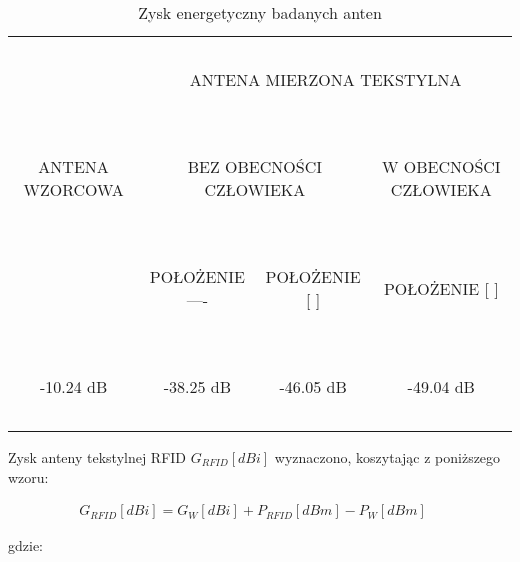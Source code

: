 \begin{table}[h!]
\begin{center}
    \begin{tabular}{|c|c|c|c|}
    \hline
    ~               & \multicolumn{3}{c|}{~}     \\
    ~               & \multicolumn{3}{c|}{ANTENA MIERZONA TEKSTYLNA } \\
    ~               & \multicolumn{3}{c|}{~}     \\ \hline
    ~               & \multicolumn{2}{c|}{~}     & ~                                  \\
    ANTENA WZORCOWA & \multicolumn{2}{c|}{BEZ OBECNOŚCI CZŁOWIEKA} & W OBECNOŚCI CZŁOWIEKA              \\
    ~               & \multicolumn{2}{c|}{~}     & ~                                  \\ \hline
    ~               & ~                          & ~                                  & ~                                  \\
    ~               & POŁOŻENIE ----             & POŁOŻENIE [     ]                  & POŁOŻENIE [    ]                   \\
    ~               & ~                          & ~                                  & ~                                  \\ \hline
    ~               & ~                          & ~                                  & ~                                  \\
    -10.24 dB       & -38.25 dB                  & -46.05 dB                          & -49.04 dB                          \\
    ~               & ~                          & ~                                  & ~                                  \\ \hline
    \end{tabular}
    \caption{Zysk energetyczny badanych anten}
\end{center}
\end{table}


\noindent
\newline Zysk anteny tekstylnej RFID $G_{RFID}[dBi]$  wyznaczono, koszytając z poniższego wzoru:

\begin{align}
G_{RFID}[dBi] = G_{W}[dBi] + P_{RFID}[dBm] - P_W[dBm]
\quad
\end{align}


\noindent
\newline gdzie: 

